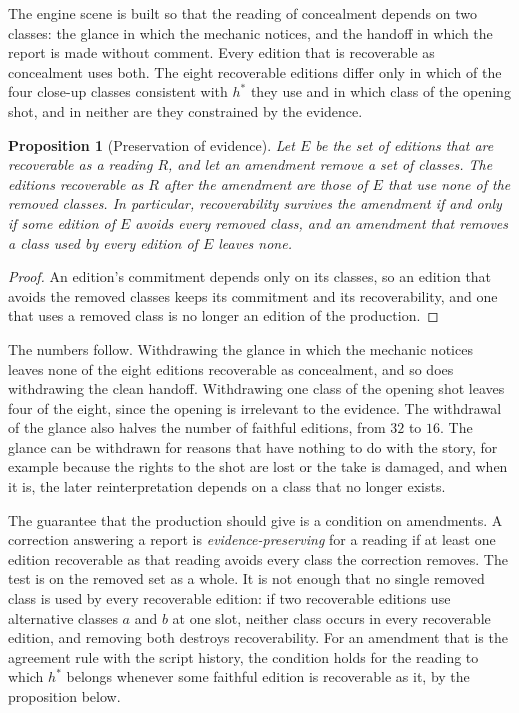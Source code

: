 \documentclass[11pt,twoside,openright]{book}
\theoremstyle{plain}
\newtheorem{proposition}[theorem]{Proposition}
\theoremstyle{definition}
\theoremstyle{remark}
\begin{document}
The engine scene is built so that the reading of concealment depends on two classes: the glance in which the mechanic notices, and the handoff in which the report is made without comment. Every edition that is recoverable as concealment uses both. The eight recoverable editions differ only in which of the four close-up classes consistent with $h^\ast$ they use and in which class of the opening shot, and in neither are they constrained by the evidence.

\begin{proposition}[Preservation of evidence]\label{prop:evidence}
Let $E$ be the set of editions that are recoverable as a reading $R$, and let an amendment remove a set of classes. The editions recoverable as $R$ after the amendment are those of $E$ that use none of the removed classes. In particular, recoverability survives the amendment if and only if some edition of $E$ avoids every removed class, and an amendment that removes a class used by every edition of $E$ leaves none.
\end{proposition}

\begin{proof}
An edition's commitment depends only on its classes, so an edition that avoids the removed classes keeps its commitment and its recoverability, and one that uses a removed class is no longer an edition of the production.
\end{proof}

The numbers follow. Withdrawing the glance in which the mechanic notices leaves none of the eight editions recoverable as concealment, and so does withdrawing the clean handoff. Withdrawing one class of the opening shot leaves four of the eight, since the opening is irrelevant to the evidence. The withdrawal of the glance also halves the number of faithful editions, from $32$ to $16$. The glance can be withdrawn for reasons that have nothing to do with the story, for example because the rights to the shot are lost or the take is damaged, and when it is, the later reinterpretation depends on a class that no longer exists.

The guarantee that the production should give is a condition on amendments. A correction answering a report is \emph{evidence-preserving} for a reading if at least one edition recoverable as that reading avoids every class the correction removes. The test is on the removed set as a whole. It is not enough that no single removed class is used by every recoverable edition: if two recoverable editions use alternative classes $a$ and $b$ at one slot, neither class occurs in every recoverable edition, and removing both destroys recoverability. For an amendment that is the agreement rule with the script history, the condition holds for the reading to which $h^\ast$ belongs whenever some faithful edition is recoverable as it, by the proposition below.
\end{document}
